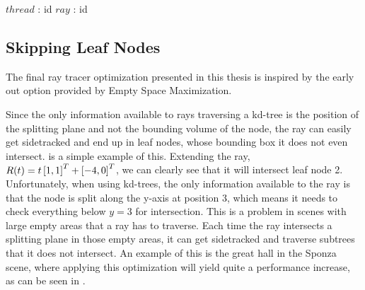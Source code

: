 \begin{algorithm}
  \caption{Converting a thread id to a ray id.}
  \label{alg:packet}
  \begin{algorithmic}
              {$thread$ : id}
              {$ray$ : id}
              {
              }
  \end{algorithmic}
\end{algorithm}


\subsection{Skipping Leaf Nodes}


The final ray tracer optimization presented in this thesis is inspired by the
early out option provided by Empty Space Maximization.


Since the only information available to rays traversing a kd-tree is the
position of the splitting plane and not the bounding volume of the node, the ray
can easily get sidetracked and end up in leaf nodes, whose bounding box it does
not even intersect.  is a simple example of
this. Extending the ray, $R(t) = t \left[1, 1 \right]^T + \left[-4, 0 \right]^T$, we can
clearly see that it will intersect leaf node 2. Unfortunately, when using
kd-trees, the only information available to the ray is that the node is split
along the y-axis at position 3, which means it needs to check everything below
$y=3$ for intersection. This is a problem in scenes with large empty areas that
a ray has to traverse. Each time the ray intersects a splitting plane in those
empty areas, it can get sidetracked and traverse subtrees that it does not
intersect. An example of this is the great hall in the Sponza scene, where
applying this optimization will yield quite a performance increase, as can be
seen in .

